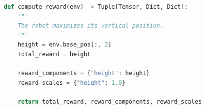 \begin{lstlisting}[language=Python]
def compute_reward(env) -> Tuple[Tensor, Dict, Dict]:
    """
    The robot maximizes its vertical position.
    """
    height = env.base_pos[:, 2]
    total_reward = height

    reward_components = {"height": height}
    reward_scales = {"height": 1.0}

    return total_reward, reward_components, reward_scales
\end{lstlisting}